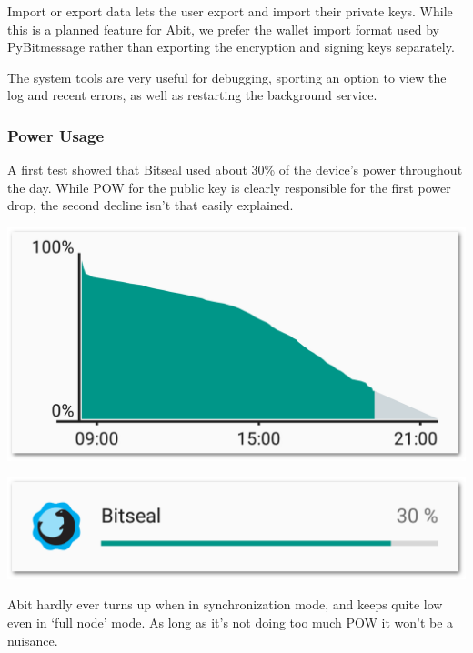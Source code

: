 \documentclass{bfh}
\begin{document}
  Import or export data lets the user export and import their private keys. While this is a planned feature for Abit, we prefer the wallet import format used by PyBitmessage rather than exporting the encryption and signing keys separately.

  The system tools are very useful for debugging, sporting an option to view the log and recent errors, as well as restarting the background service.

  \subsubsection{Power Usage}
  A first test showed that Bitseal used about 30\% of the device's power throughout the day. While \ac{POW} for the public key is clearly responsible for the first power drop, the second decline isn't that easily explained.

  \begin{center}
    \begin{minipage}{.3\linewidth}
      \includegraphics[width=1.0 \textwidth]{images/bitseal_power_usage_pow.png}
    \end{minipage}
    \hspace{.03\linewidth}
    \begin{minipage}{.3\linewidth}
      \includegraphics[width=1.0 \textwidth]{images/bitseal_power_usage_pow_2.png}
    \end{minipage}
  \end{center}

  Abit hardly ever turns up when in synchronization mode, and keeps quite low even in `full node' mode. As long as it's not doing too much \ac{POW} it won't be a nuisance.
\end{document}
